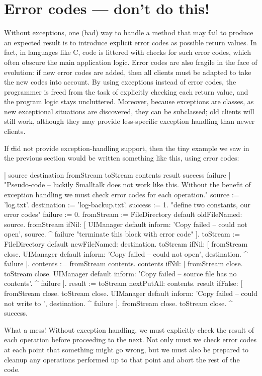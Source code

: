 \documentclass[a4paper,10pt,twoside]{book}
\begin{document}
\section{Error codes --- don't  do this!}

Without exceptions, one (bad) way to handle a method that may fail to produce an expected result is to introduce explicit error codes as possible return values. In fact, in languages like C, code is littered with checks for such error codes, which often obscure the main application logic.
Error codes are also fragile in the face of evolution: if new error codes are added, then all clients must be adapted to take the new codes into account. By using exceptions instead of error codes, the programmer is freed from the task of explicitly checking each return value, and the program logic stays uncluttered.
Moreover, because exceptions are classes, as new exceptional situations are discovered, they can be subclassed; old clients will still work, although they may provide less-specific exception handling than newer clients.

If \st did not provide exception-handling support, then the tiny example we saw in the previous section would be written something like this, using error codes:

\begin{code}{| source destination fromStream toStream contents result success failure |}
"Pseudo-code -- luckily Smalltalk does not work like this. Without the 
benefit of exception handling we must check error codes for each operation."
source := 'log.txt'.
destination := 'log-backup.txt'.
success := 1. "define two constants, our error codes"
failure := 0.
fromStream := FileDirectory default oldFileNamed: source.
fromStream ifNil: [
	UIManager default inform: 'Copy failed -- could not open', source.
	^ failure "terminate this block with error code" ].
toStream := FileDirectory default newFileNamed: destination.
toStream ifNil: [
	fromStream close.
	UIManager default inform: 'Copy failed -- could not open', destination.
	^ failure ].
contents := fromStream contents.
contents ifNil: [
	fromStream close.
	toStream close.
	UIManager default inform: 'Copy failed -- source file has no contents'.
	^ failure ].
result := toStream nextPutAll: contents.
result ifFalse: [
	fromStream close.
	toStream close.
	UIManager default inform: 'Copy failed -- could not write to ', destination.
	^ failure ].
fromStream close.
toStream close.
^ success.
\end{code}
\noindent
What a mess!
Without exception handling, we must explicitly check the result of each operation before proceeding to the next.
Not only must we check error codes at each point that something might go wrong, but we must also be prepared to cleanup any operations performed up to that point and abort the rest of the code.
\end{document}
